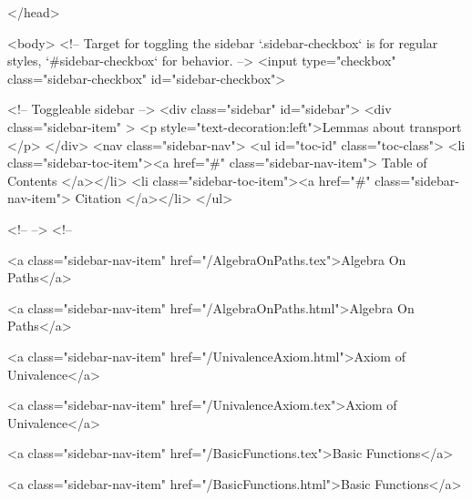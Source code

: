   
</head>




  <body>
    <!-- Target for toggling the sidebar `.sidebar-checkbox` is for regular
     styles, `#sidebar-checkbox` for behavior. -->
<input type="checkbox" class="sidebar-checkbox" id="sidebar-checkbox">

<!-- Toggleable sidebar -->
<div class="sidebar" id="sidebar">
  <div class="sidebar-item" >
    <p style="text-decoration:left">Lemmas about transport </p>
  </div>
  <nav class="sidebar-nav">
    <ul id="toc-id" class="toc-class">
  <li class="sidebar-toc-item"><a href="#" class="sidebar-nav-item"> Table of Contents </a></li>
  <li class="sidebar-toc-item"><a href="#" class="sidebar-nav-item"> Citation </a></li>
</ul>


    <!--  -->
    <!-- 
      
    
      
    
      
    
      
        
      
    
      
        
          <a class="sidebar-nav-item" href="/AlgebraOnPaths.tex">Algebra On Paths</a>
        
      
    
      
        
          <a class="sidebar-nav-item" href="/AlgebraOnPaths.html">Algebra On Paths</a>
        
      
    
      
        
          <a class="sidebar-nav-item" href="/UnivalenceAxiom.html">Axiom of Univalence</a>
        
      
    
      
        
          <a class="sidebar-nav-item" href="/UnivalenceAxiom.tex">Axiom of Univalence</a>
        
      
    
      
        
          <a class="sidebar-nav-item" href="/BasicFunctions.tex">Basic Functions</a>
        
      
    
      
        
          <a class="sidebar-nav-item" href="/BasicFunctions.html">Basic Functions</a>
        
      
    
      
        
